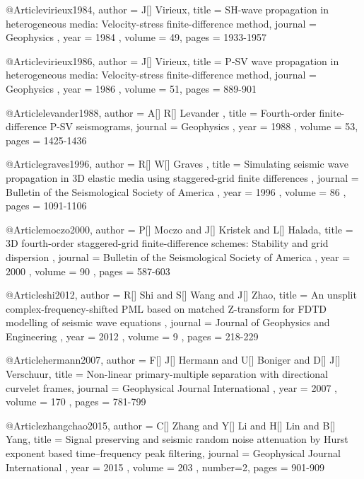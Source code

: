 {@Article{virieux1984,
 author =  { J[] Virieux},
 title =   { SH-wave propagation in heterogeneous media: Velocity-stress finite-difference method},
 journal = { Geophysics },
 year =    { 1984 },
 volume =  { 49},
 pages =   { 1933-1957 }
}

@Article{virieux1986,
 author =  { J[] Virieux},
 title =   { P-SV wave propagation in heterogeneous media: Velocity-stress finite-difference method},
 journal = { Geophysics },
 year =    { 1986 },
 volume =  { 51},
 pages =   { 889-901 }
}

@Article{levander1988,
 author =  { A[] R[] Levander },
 title =   { Fourth-order finite-difference P-SV seismograms},
 journal = { Geophysics },
 year =    { 1988 },
 volume =  { 53},
 pages =   { 1425-1436 }
}

@Article{graves1996,
 author =  { R[] W[] Graves },
 title =   { Simulating seismic wave propagation in 3{D} elastic media using staggered-grid finite differences },
 journal = { Bulletin of the Seismological Society of America },
 year =    { 1996 },
 volume =  { 86 },
 pages =   { 1091-1106 }
}

@Article{moczo2000,
 author =  {  P[] Moczo and J[] Kristek and L[] Halada},
 title =   { 3{D} fourth-order staggered-grid finite-difference schemes: Stability and grid dispersion },
 journal = { Bulletin of the Seismological Society of America },
 year =    { 2000 },
 volume =  { 90 },
 pages =   { 587-603 }
}

@Article{shi2012,
 author =  {  R[] Shi and S[] Wang and J[] Zhao},
 title =   {An unsplit complex-frequency-shifted PML based on matched Z-transform for FDTD modelling of seismic wave equations },
 journal = { Journal of Geophysics and Engineering },
 year =    { 2012 },
 volume =  { 9 },
 pages =   { 218-229 }
}

@Article{hermann2007,
 author =  {  F[] J[] Hermann and U[] Boniger and D[] J[] Verschuur},
 title =   {Non-linear primary-multiple separation with directional curvelet frames},
 journal = { Geophysical Journal International },
 year =    { 2007 },
 volume =  { 170 },
 pages =   { 781-799 }
}

@Article{zhangchao2015,
 author =  {  C[] Zhang and Y[] Li and H[] Lin and B[] Yang},
 title =   {Signal preserving and seismic random noise attenuation by Hurst exponent based time–frequency peak filtering},
 journal = { Geophysical Journal International },
 year =    { 2015 },
 volume =  { 203 },
 number=2,
 pages =   { 901-909 }
}



}
